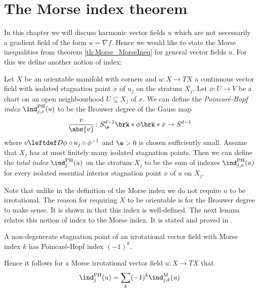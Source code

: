 
\section{The Morse index theorem}

In this chapter we will discuss harmonic vector fields $u$ which are not necessarily a
gradient field of the form $u=\nabla f$. Hence we would like to state the Morse inequalities from theorem \ref{th:Morse_MorseIneq}
for general vector fields $u$.
For this we define another notion of index:
\begin{definition}
  \label{df:poincareHopf_index}
  Let $X$ be an orientable manifold with corners and $u\colon X\to TX$ a continuous vector field
  with isolated stagnation point $x$ of $u_j$ on the stratum $X_j$.
  Let $\phi\colon U\to V$ be a chart on an open neighbourhood $U\subseteq X_j$ of $x$.
  We can define the
  \emph{Poincaré-Hopf index} $\ind^{\text{PH}}_{j,x}(u)$ to be the Brouwer degree of the Gauss map
  \begin{align*}
    \frac{v}{\abs{v}}\colon S^{d-1}_\e\brk*{\phi\brk*{x}}\to S^{d-1}
  \end{align*}
  where $v\leftdef D\phi\circ u_j\circ \phi^{-1}$ and $\e>0$ is chosen sufficiently small.
  Assume that $X_j$ has at most finitely many isolated stagnation points.
  Then we can define the
   \emph{total index} $\ind^{\text{PH}}_{j}(u)$ on the stratum $X_j$ to be the sum of indexes $\ind^{\text{PH}}_{j,x}(u)$
  for every isolated essential interior stagnation point $x$ of $u$ on $X_j$.
\end{definition}
Note that unlike in the definition of the Morse index we do not require $u$ to be irrotational.
The reason for requiring $X$ to be orientable is for the Brouwer degree to make sense.
It is shown in \cite[§6, Lemma 1]{Milnor1965} that this index is well-defined.
The next lemma relates this notion of index to the Morse index.
It is stated and proved in \cite[§6, Lemma 4]{Milnor1965}.
\begin{lemma}
  A non-degenerate stagnation point of an irrotational vector field
  with Morse index $k$ has Poincaré-Hopf index $(-1)^k$.
\end{lemma}
Hence it follows for a Morse irrotational vector field $u\colon X\to TX$ that
\begin{align*}
  \ind^{\text{PH}}_j(u)=\sum_k(-1)^k\ind^\text{M}_{j,k}(u)
\end{align*}
